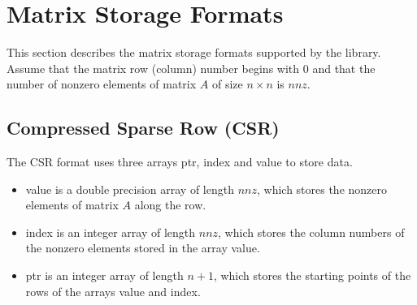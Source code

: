 \documentclass[a4paper]{article}
\begin{document}
\newpage
\section{Matrix Storage Formats}
\label{sec:storages}
This section describes the matrix storage formats supported by the library. 
Assume that the matrix row (column) number begins with $0$ and 
that the number of nonzero elements of matrix $A$ of size $n \times
n$ is $nnz$.

\subsection{Compressed Sparse Row (CSR)}
The CSR format uses three arrays {\ttfamily ptr}, {\ttfamily index} and {\ttfamily value} to store data.
\begin{itemize}
\item {\ttfamily value} is a double precision array of length 
      $nnz$, which stores the nonzero elements of matrix $A$ along the row.
\item {\ttfamily index} is an integer array of length $nnz$,
      which stores the column numbers of the nonzero elements stored in
      the  array {\ttfamily value}.
\item {\ttfamily ptr} is an integer array of length $n+1$, which
      stores the starting points of the rows of the arrays {\ttfamily value} and {\ttfamily index}. 
\end{itemize}
\end{document}
